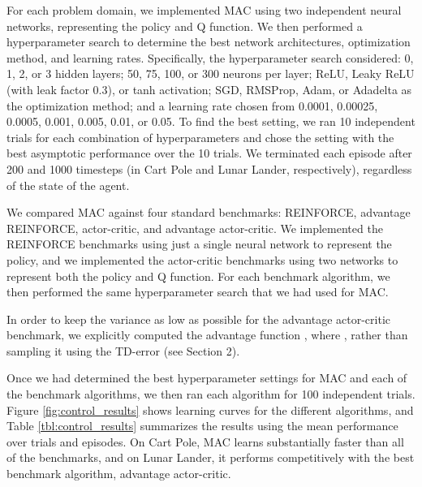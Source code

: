 \documentclass[letterpaper]{article}
\begin{document}
For each problem domain, we implemented MAC using two independent neural networks, representing the policy and Q function. We then performed a hyperparameter search to determine the best network architectures, optimization method, and learning rates. Specifically, the hyperparameter search considered: 0, 1, 2, or 3 hidden layers; 50, 75, 100, or 300 neurons per layer; ReLU, Leaky ReLU (with leak factor 0.3), or tanh activation; SGD, RMSProp, Adam, or Adadelta as the optimization method; and a learning rate chosen from 0.0001, 0.00025, 0.0005, 0.001, 0.005, 0.01, or 0.05. To find the best setting, we ran 10 independent trials for each combination of hyperparameters and chose the setting with the best asymptotic performance over the 10 trials. We terminated each episode after 200 and 1000 timesteps (in Cart Pole and Lunar Lander, respectively), regardless of the state of the agent.



We compared MAC against four standard benchmarks: REINFORCE, advantage REINFORCE, actor-critic, and advantage actor-critic. We implemented the REINFORCE benchmarks using just a single neural network to represent the policy, and we implemented the actor-critic benchmarks using two networks to represent both the policy and Q function. For each benchmark algorithm, we then performed the same hyperparameter search that we had used for MAC.

In order to keep the variance as low as possible for the advantage actor-critic benchmark, we explicitly computed the advantage function , where , rather than sampling it using the TD-error (see Section 2).

Once we had determined the best hyperparameter settings for MAC and each of the benchmark algorithms, we then ran each algorithm for 100 independent trials. Figure \ref{fig:control_results} shows learning curves for the different algorithms, and Table \ref{tbl:control_results} summarizes the results using the mean performance over trials and episodes. On Cart Pole, MAC learns substantially faster than all of the benchmarks, and on Lunar Lander, it performs competitively with the best benchmark algorithm, advantage actor-critic.
\end{document}
